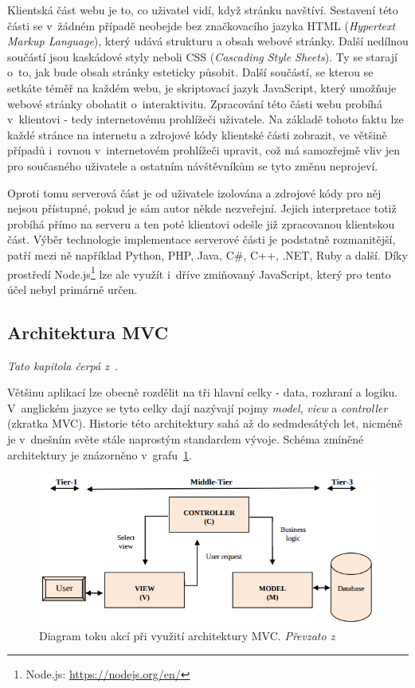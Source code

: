 Klientská část webu je to, co uživatel vidí, když stránku navštíví. Sestavení této části se v~žádném případě neobejde bez značkovacího jazyka HTML (\emph{Hypertext Markup Language}), který udává strukturu a obsah webové stránky. Další nedílnou součástí jsou kaskádové styly neboli CSS (\emph{Cascading Style Sheets}). Ty se starají o~to, jak bude obsah stránky esteticky působit. Další součástí, se kterou se setkáte téměř na každém webu, je skriptovací jazyk JavaScript, který umožňuje webové stránky obohatit o~interaktivitu.
Zpracování této části webu probíhá v~klientovi - tedy internetovému prohlížeči uživatele. Na základě tohoto faktu lze každé stránce na internetu  a zdrojové kódy klientské části zobrazit, ve většině případů i~rovnou v~internetovém prohlížeči upravit, což má samozřejmě vliv jen pro současného uživatele a ostatním návštěvníkům se tyto změnu neprojeví.

Oproti tomu serverová část je od uživatele izolována a zdrojové kódy pro něj nejsou přístupné, pokud je sám autor někde nezveřejní. Jejich interpretace totiž probíhá přímo na serveru a ten poté klientovi odešle již zpracovanou klientskou část. Výběr technologie implementace serverové části je podstatně rozmanitější, patří mezi ně například Python, PHP, Java, C\#, C++, .NET, Ruby a další. Díky prostředí Node.js\footnote{Node.js: \url{https://nodejs.org/en/}} lze ale využít i~dříve zmiňovaný JavaScript, který pro tento účel nebyl primárně určen. 


\subsection{Architektura MVC}
\emph{Tato kapitola čerpá z~\cite{bib:mvc}}.

Většinu aplikací lze obecně rozdělit na tři hlavní celky - data, rozhraní a logiku. V~anglickém jazyce se tyto celky dají nazývají pojmy \emph{model}, \emph{view} a \emph{controller} (zkratka MVC). Historie této architektury sahá až do sedmdesátých let, nicméně je v~dnešním světe stále naprostým standardem vývoje. Schéma zmíněné architektury je znázorněno v~grafu~\ref{img:mvc}.

\begin{figure}[H]
	\centering
	\includegraphics[width=\textwidth]{obrazky-figures/mvc.png}
	\caption{Diagram toku akcí při využití architektury MVC. \emph{Převzato z~\cite{bib:mvc}}}
	\label{img:mvc}
\end{figure}

